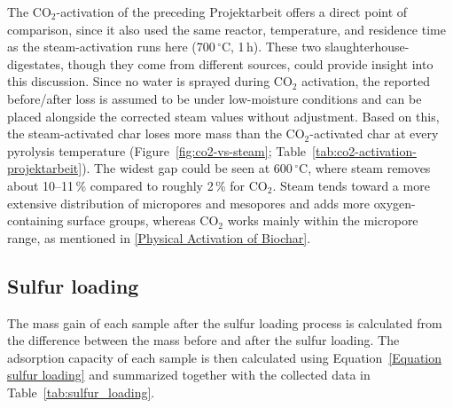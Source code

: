 The CO$_2$-activation of the preceding Projektarbeit offers a direct point of comparison, since it also used the same reactor, temperature, and residence time as the steam-activation runs here (700\,$^{\circ}$C, 1\,h). These two slaughterhouse-digestates, though they come from different sources, could provide insight into this discussion. Since no water is sprayed during CO$_2$ activation, the reported before/after loss is assumed to be under low-moisture conditions and can be placed alongside the corrected steam values without adjustment. Based on this, the steam-activated char loses more mass than the CO$_2$-activated char at every pyrolysis temperature (Figure~\ref{fig:co2-vs-steam}; Table~\ref{tab:co2-activation-projektarbeit}). The widest gap could be seen at 600\,$^{\circ}$C, where steam removes about 10--11\,\% compared to roughly 2\,\% for CO$_2$. 
Steam tends toward a more extensive distribution of micropores and mesopores and adds more oxygen-containing surface groups, whereas CO$_2$ works mainly within the micropore range, as mentioned in \ref{Physical Activation of Biochar}. 

\newpage
\subsection{Sulfur loading}

The mass gain of each sample after the sulfur loading process is calculated from the difference
between the mass before and after the sulfur loading. The adsorption capacity of each sample is then calculated using Equation~\ref{Equation sulfur loading} and summarized together with the collected data in Table~\ref{tab:sulfur_loading}. 


